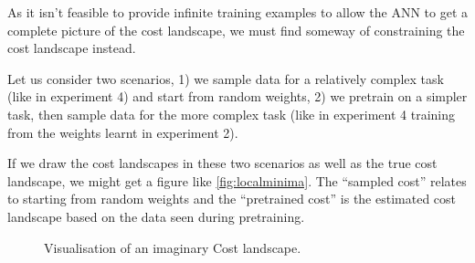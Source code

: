As it isn't feasible to provide infinite training examples to allow the \ac{ANN} to get a complete picture of the cost landscape, we must find someway of constraining the cost landscape instead.

Let us consider two scenarios, 1) we sample data for a relatively complex task (like in experiment 4) and start from random weights, 2) we pretrain on a simpler task, then sample data for the more complex task (like in experiment 4 training from the weights learnt in experiment 2).

If we draw the cost landscapes in these two scenarios as well as the true cost landscape, we might get a figure like \autoref{fig:localminima}. The ``sampled cost'' relates to starting from random weights and the ``pretrained cost'' is the estimated cost landscape based on the data seen during pretraining.
\begin{figure}[h!]
\begin{center}
\caption{Visualisation of an imaginary Cost landscape.}
\label{fig:localminima}
\end{center}
\end{figure}

